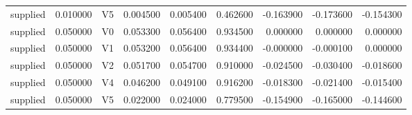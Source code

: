\begin{tabular}{lrlrrrrrr}
supplied & 0.010000 & V5 & 0.004500 & 0.005400 & 0.462600 & -0.163900 & -0.173600 & -0.154300 \\
supplied & 0.050000 & V0 & 0.053300 & 0.056400 & 0.934500 & 0.000000 & 0.000000 & 0.000000 \\
supplied & 0.050000 & V1 & 0.053200 & 0.056400 & 0.934400 & -0.000000 & -0.000100 & 0.000000 \\
supplied & 0.050000 & V2 & 0.051700 & 0.054700 & 0.910000 & -0.024500 & -0.030400 & -0.018600 \\
supplied & 0.050000 & V4 & 0.046200 & 0.049100 & 0.916200 & -0.018300 & -0.021400 & -0.015400 \\
supplied & 0.050000 & V5 & 0.022000 & 0.024000 & 0.779500 & -0.154900 & -0.165000 & -0.144600 \\
\bottomrule
\end{tabular}
